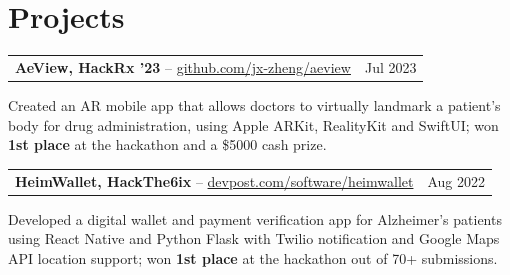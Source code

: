 \documentclass[letterpaper,10pt]{article}
\makeatletter
\newcommand{\entry}[2]{%
  \noindent\begin{tabularx}{\linewidth}{@{}X r@{}}
    #1 & #2 \\
  \end{tabularx}%
}
\makeatother
\begin{document}
\section{Projects}

\entry{\textbf{AeView, HackRx '23} -- \href{https://github.com/jx-zheng/aeview}{github.com/jx-zheng/aeview}}{Jul 2023}
\begin{tight}
  \item Created an AR mobile app that allows doctors to virtually landmark a patient's body for drug administration, using Apple ARKit, RealityKit and SwiftUI; won \textbf{1st place} at the hackathon and a \$5000 cash prize.
\end{tight}

\entry{\textbf{HeimWallet, HackThe6ix} -- \href{https://devpost.com/software/heimwallet}{devpost.com/software/heimwallet}}{Aug 2022}
\begin{tight}
  \item Developed a digital wallet and payment verification app for Alzheimer's patients using React Native and Python Flask with Twilio notification and Google Maps API location support; won \textbf{1st place} at the hackathon out of 70+ submissions.
\end{tight}
\end{document}
